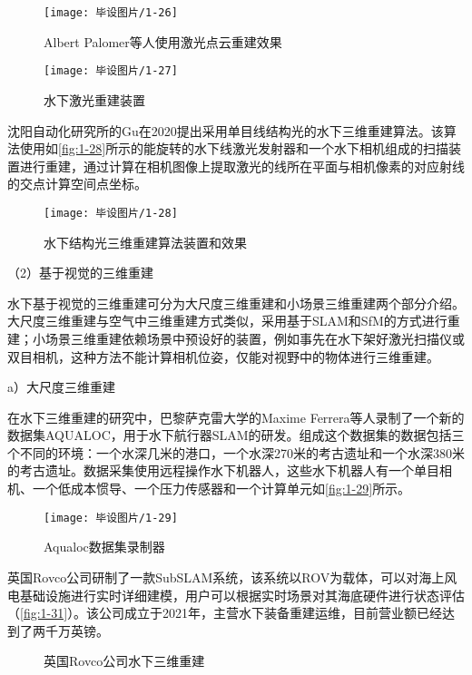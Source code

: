 \begin{figure}[htbp]
    \centering
    \texttt{[image: 毕设图片/1-26]}
    \caption{\label{fig:1-26}Albert Palomer等人使用激光点云重建效果\cite{PALOMER}}
\end{figure}

\begin{figure}[htbp]
    \centering
    \texttt{[image: 毕设图片/1-27]}
    \caption{\label{fig:1-27}水下激光重建装置\cite{PALOMER}}
\end{figure}

沈阳自动化研究所的Gu\cite{Gu}在2020提出采用单目线结构光的水下三维重建算法。该算法使用如\autoref{fig:1-28}所示的能旋转的水下线激光发射器和一个水下相机组成的扫描装置进行重建，通过计算在相机图像上提取激光的线所在平面与相机像素的对应射线的交点计算空间点坐标。

\begin{figure}[htbp]
    \centering
    \texttt{[image: 毕设图片/1-28]}
    \caption{\label{fig:1-28}水下结构光三维重建算法装置和效果\cite{Gu}}
\end{figure}

（2）基于视觉的三维重建

水下基于视觉的三维重建可分为大尺度三维重建和小场景三维重建两个部分介绍。大尺度三维重建与空气中三维重建方式类似，采用基于SLAM和SfM的方式进行重建；小场景三维重建依赖场景中预设好的装置，例如事先在水下架好激光扫描仪或双目相机，这种方法不能计算相机位姿，仅能对视野中的物体进行三维重建。

a）大尺度三维重建

在水下三维重建的研究中，巴黎萨克雷大学的Maxime Ferrera等人录制了一个新的数据集AQUALOC\cite{AQUALOC}，用于水下航行器SLAM的研发。组成这个数据集的数据包括三个不同的环境：一个水深几米的港口，一个水深270米的考古遗址和一个水深380米的考古遗址。数据采集使用远程操作水下机器人，这些水下机器人有一个单目相机、一个低成本惯导、一个压力传感器和一个计算单元如\autoref{fig:1-29}所示。

\begin{figure}[htbp]
    \centering
    \texttt{[image: 毕设图片/1-29]}
    \caption{\label{fig:1-29}Aqualoc数据集录制器}
\end{figure}

英国Rovco\cite{营业额}公司研制了一款SubSLAM系统，该系统以ROV为载体，可以对海上风电基础设施进行实时详细建模，用户可以根据实时场景对其海底硬件进行状态评估（\autoref{fig:1-31}）。该公司成立于2021年，主营水下装备重建运维，目前营业额已经达到了两千万英镑。

\begin{figure}[htpb]
	\centering %
	\caption{英国Rovco公司水下三维重建\cite{营业额}}
	\label{fig:1-31}
\end{figure}

